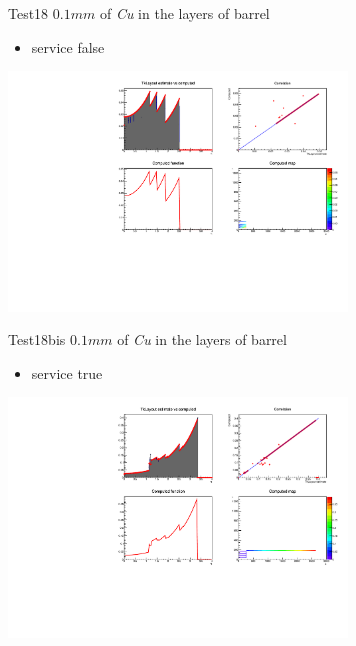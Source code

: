 \documentclass[pdftex, 11pt]{beamer}
\begin{document}
\begin{frame}
  \begin{block}{Test18}
    \alert{$0.1 mm$} of \emph{Cu} in the layers of barrel
    \begin{itemize}
    \item \alert{service} false
    \end{itemize}
  \end{block}
  \begin{center}
    \includegraphics[width=9cm]{img/test18.pdf}
  \end{center}
\end{frame}

\begin{frame}
  \begin{block}{Test18bis}
    \alert{$0.1 mm$} of \emph{Cu} in the layers of barrel
    \begin{itemize}
    \item \alert{service} true
    \end{itemize}
  \end{block}
  \begin{center}
    \includegraphics[width=9cm]{img/test18bis.pdf}
  \end{center}
\end{frame}
\end{document}
